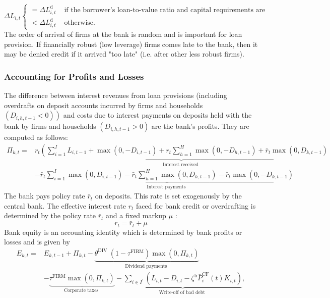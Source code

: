 \begin{equation}
    \Delta L_{i,t} \begin{cases}=\Delta L_{i,t}^{\mathrm{d}} & \text { if the borrower's loan-to-value ratio and capital requirements are satisfied } \\ <\Delta L_{i,t}^{\mathrm{d}} & \text { otherwise. }\end{cases}
\end{equation}
The order of arrival of firms at the bank is random and is important for loan provision. If financially robust (low leverage) firms comes late to the bank, then it may be denied credit if it arrived "too late" (i.e. after other less robust firms). 
\subsubsection{Accounting for Profits and Losses}
The difference between interest revenues from loan provisions (including overdrafts on deposit accounts incurred by firms and households $\left.\left(D_{i, h,t-1}<0\right)\right)$ and costs due to interest payments on deposits held with the bank by firms and households $\left(D_{i, h,t-1}>0\right)$ are the bank's profits. They are computed as follows:
\begin{equation}
    \begin{aligned}
\Pi_{k,t}= & \underbrace{r_t\left(\sum_{i=1}^I L_{i,t-1}+\max \left(0,-D_{i,t-1}\right)+r_t \sum_{h=1}^H \max \left(0,-D_{h,t-1}\right)+\bar{r}_t \max \left(0, D_{k,t-1}\right)\right.}_{\text {Interest received }} \\
& -\underbrace{\bar{r}_t \sum_{i=1}^I \max \left(0, D_{i,t-1}\right)-\bar{r}_t \sum_{h=1}^H \max \left(0, D_{h,t-1}\right)-\bar{r}_t \max \left(0,-D_{k,t-1}\right)}_{\text {Interest payments }}
\end{aligned}
\end{equation}
The bank pays policy rate $\bar{r}_t$ on deposits. This rate is set exogenously by the central bank.  The effective interest rate $r_t$ faced for bank credit or overdrafting is determined by the policy rate $\bar{r}_t$ and a fixed markup $\mu$ :
\begin{equation}
    r_t=\bar{r}_t+\mu
\end{equation}
Bank equity is an accounting identity which is determined by bank profits or losses and is given by
\begin{equation}
    \begin{aligned}
E_{k,t}= & E_{k,t-1}+\Pi_{k,t}-\underbrace{\theta^{\text {DIV }}\left(1-\tau^{\mathrm{FIRM}}\right) \max \left(0, \Pi_{k,t}\right)}_{\text {Dividend payments }} \\
& -\underbrace{\tau^{\mathrm{FIRM}} \max \left(0, \Pi_{k,t}\right)}_{\text {Corporate taxes }}-\underbrace{\sum_{i \in I^{\prime}}\left(L_{i,t}-D_{i,t}-\zeta^{\mathrm{b}} \bar{P}_i^{\mathrm{CF}}(t) K_{i,t}\right)}_{\text {Write-off of bad debt }},
\end{aligned}
\end{equation}

